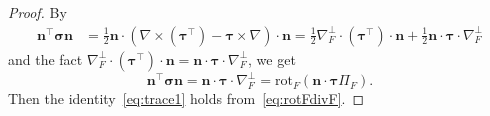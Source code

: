 \begin{proof}
By
\begin{align*}
\boldsymbol n^{\intercal}\boldsymbol\sigma\boldsymbol n&=\frac{1}{2}\boldsymbol n\cdot(\nabla\times(\boldsymbol\tau^{\intercal})-\boldsymbol\tau\times\nabla)\cdot\boldsymbol n=\frac{1}{2}\nabla_F^{\bot}\cdot(\boldsymbol\tau^{\intercal})\cdot\boldsymbol n + \frac{1}{2}\boldsymbol n\cdot\boldsymbol\tau\cdot\nabla_F^{\bot}
\end{align*}
and the fact $\nabla_F^{\bot}\cdot(\boldsymbol\tau^{\intercal})\cdot\boldsymbol n=\boldsymbol n\cdot\boldsymbol\tau\cdot\nabla_F^{\bot}$, we get
$$
\boldsymbol n^{\intercal}\boldsymbol\sigma\boldsymbol n=\boldsymbol n\cdot\boldsymbol\tau\cdot\nabla_F^{\bot}=\mathrm{rot}_F (\boldsymbol n\cdot\boldsymbol \tau \Pi_F).
$$
Then the identity~\eqref{eq:trace1} holds from~\eqref{eq:rotFdivF}.


\end{proof}
